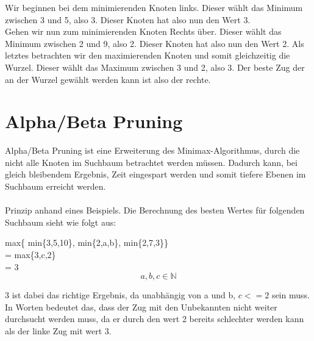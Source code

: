 \documentclass[12pt,a4paper]{article}
\begin{document}
Wir beginnen bei dem minimierenden Knoten links.
Dieser wählt das Minimum zwischen 3 und 5, also 3.
Dieser Knoten hat also nun den Wert 3.\\
Gehen wir nun zum minimierenden Knoten Rechts über.
Dieser wählt das Minimum zwischen 2 und 9, also 2.
Dieser Knoten hat also nun den Wert 2.
Als letztes betrachten wir den maximierenden Knoten und somit gleichzeitig die Wurzel.
Dieser wählt das Maximum zwischen 3 und 2, also 3.
Der beste Zug der an der Wurzel gewählt werden kann ist also der rechte.

\section{Alpha/Beta Pruning}
Alpha/Beta Pruning ist eine Erweiterung des Minimax-Algorithmus, durch die nicht alle Knoten im Suchbaum betrachtet werden müssen. Dadurch kann, bei gleich bleibendem Ergebnis, Zeit eingespart werden und somit tiefere Ebenen im Suchbaum erreicht werden.
\\\\
Prinzip anhand eines Beispiels.
Die Berechnung des besten Wertes für folgenden Suchbaum sieht wie folgt aus:
\begin{flushleft}
max\{ min\{3,5,10\}, min\{2,a,b\}, min\{2,7,3\}\}\\ = max\{3,c,2\}\\ = 3      $$a,b,c \in \mathbb{N}$$
\end{flushleft}
3 ist dabei das richtige Ergebnis, da unabhängig von a und b, $c<=2$ sein muss. In Worten bedeutet das, dass der Zug mit den Unbekannten nicht weiter durchsucht werden muss, da er durch den wert 2 bereits schlechter werden kann als der linke Zug mit wert 3. 
\end{document}
